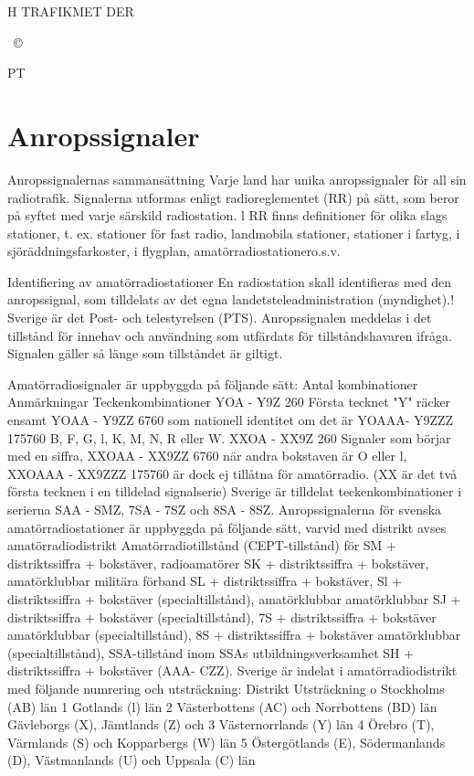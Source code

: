 H TRAFIKMET DER

~©~

PT

\section{Anropssignaler}
Anropssignalernas sammansättning
Varje land har unika anropssignaler för all
sin radiotrafik. Signalerna utformas enligt
radioreglementet (RR) på sätt, som beror på
syftet med varje särskild radiostation. l RR
finns definitioner för olika slags stationer,
t. ex. stationer för fast radio, landmobila stationer, stationer i fartyg, i sjöräddningsfarkoster, i flygplan, amatörradiostationero.s.v.

Identifiering av amatörradiostationer
En radiostation skall identifieras med den
anropssignal, som tilldelats av det egna landetsteleadministration (myndighet).! Sverige
är det Post- och telestyrelsen (PTS).
Anropssignalen meddelas i det tillstånd för
innehav och användning som utfärdats för
tillståndshavaren ifråga. Signalen gäller så
länge som tillståndet är giltigt.

Amatörradiosignaler är uppbyggda på följande sätt:
Antal kombinationer Anmärkningar
Teckenkombinationer
YOA - Y9Z
260
Första tecknet "Y" räcker ensamt
YOAA - Y9ZZ
6760
som nationell identitet om det är
YOAAA- Y9ZZZ
175760
B, F, G, l, K, M, N, R eller W.
XXOA - XX9Z
260
Signaler som börjar med en siffra,
XXOAA - XX9ZZ
6760
när andra bokstaven är O eller l,
XXOAAA - XX9ZZZ
175760
är dock ej tillåtna för amatörradio.
(XX är det två första tecknen i en tilldelad signalserie)
Sverige är tilldelat teckenkombinationer i serierna SAA - SMZ, 7SA - 7SZ och 8SA - 8SZ.
Anropssignalerna för svenska amatörradiostationer är uppbyggda på följande sätt, varvid
med distrikt avses amatörradiodistrikt
Amatörradiotillstånd (CEPT-tillstånd) för
SM + distriktssiffra + bokstäver,
radioamatörer
SK + distriktssiffra + bokstäver,
amatörklubbar
militära förband
SL + distriktssiffra + bokstäver,
Sl + distriktssiffra + bokstäver
(specialtillstånd),
amatörklubbar
amatörklubbar
SJ + distriktssiffra + bokstäver
(specialtillstånd),
7S + distriktssiffra + bokstäver
amatörklubbar
(specialtillstånd),
8S + distriktssiffra + bokstäver
amatörklubbar
(specialtillstånd),
SSA-tillstånd inom SSAs utbildningsverksamhet
SH + distriktssiffra + bokstäver (AAA- CZZ).
Sverige är indelat i amatörradiodistrikt med följande numrering och utsträckning:
Distrikt Utsträckning
o Stockholms (AB) län
1
Gotlands (l) län
2
Västerbottens (AC) och
Norrbottens (BD) län
Gävleborgs (X), Jämtlands (Z) och
3
Västernorrlands (Y) län
4
Örebro (T), Värmlands (S) och
Kopparbergs (W) län
5
Östergötlands (E), Södermanlands
(D), Västmanlands (U) och Uppsala
(C) län

